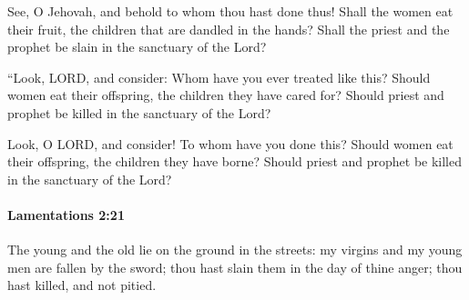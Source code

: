 			\begin{versebox}
					\item[BHS] 
					\item[LXX] 
					\item[ASV] See, O Jehovah, and behold to whom thou hast done thus! Shall the women eat their fruit, the children that are dandled in the hands? Shall the priest and the prophet be slain in the sanctuary of the Lord?
					\item[NIV] “Look, LORD, and consider: Whom have you ever treated like this? Should women eat their offspring, the children they have cared for? Should priest and prophet be killed in the sanctuary of the Lord?
					\item[NRSV] Look, O LORD, and consider! To whom have you done this? Should women eat their offspring, the children they have borne? Should priest and prophet be killed in the sanctuary of the Lord?
			\end{versebox}

		\paragraph{Lamentations 2:21} %
			\label{LAMENTATIONS-2-21}

			The young and the old lie on the ground in the streets: my virgins and my young men are fallen by the sword; thou hast slain them in the day of thine anger; thou hast killed, and not pitied.

